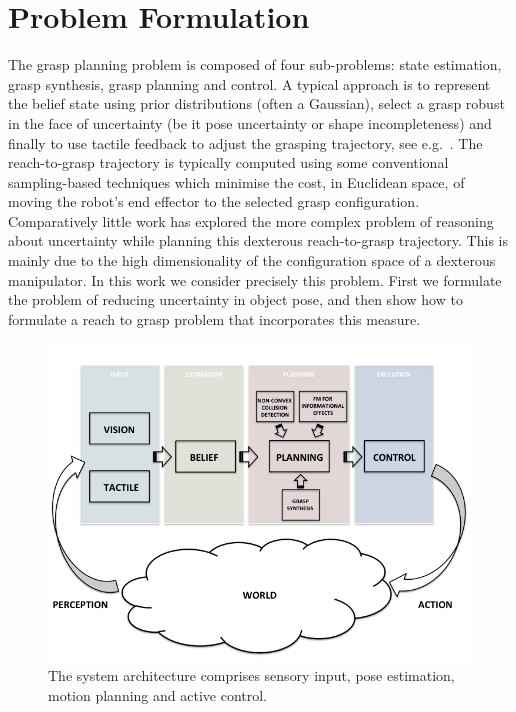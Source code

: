 \section{Problem Formulation}
\label{sec:problem}

The grasp planning problem is composed of four sub-problems: state estimation, grasp synthesis, grasp planning and control. A typical approach is to represent the belief state using prior distributions (often a Gaussian), select a grasp robust in the face of uncertainty (be it pose uncertainty or shape incompleteness) and  finally to use tactile feedback to adjust the grasping trajectory, see e.g.~\citep{bib:nikandrova_2014}. The reach-to-grasp trajectory is typically computed using some conventional sampling-based techniques which minimise the cost, in Euclidean space, of moving the robot's end effector to the selected grasp configuration. Comparatively little work has explored the more complex problem of reasoning about uncertainty while planning this dexterous reach-to-grasp trajectory. This is mainly due to the high dimensionality of the configuration space of a dexterous manipulator.  In this work we consider precisely this problem. First we formulate the problem of reducing uncertainty in object pose, and then show how to formulate a reach to grasp problem that incorporates this measure.

\begin{figure}[t]
\centerline{
\includegraphics[width=.98\columnwidth]{img/ch07_architecture.png}
}
\caption[SPAM-PLAN for grasping]{The system architecture comprises sensory input, pose estimation, motion planning and active control.}
\label{fig:architecture}
\end{figure}

